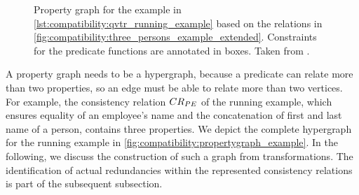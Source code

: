 \begin{figure}
    \centering
    
    
    \caption[Property graph for the running example]{Property graph for the \qvtr example in \autoref{lst:compatibility:qvtr_running_example} based on the relations in \autoref{fig:compatibility:three_persons_example_extended}. Constraints for the predicate functions are annotated in boxes. Taken from .}
    \label{fig:compatibility:propertygraph_example}
\end{figure}

A property graph needs to be a hypergraph, because a predicate can relate more than two properties, so an edge must be able to relate more than two vertices.
For example, the consistency relation $\consistencyrelation{CR}{PE}$ of the running example, which ensures equality of an employee's name and the concatenation of first and last name of a person, contains three properties.
We depict the complete hypergraph for the running example in \autoref{fig:compatibility:propertygraph_example}.
In the following, we discuss the construction of such a graph from \qvtr transformations.
The identification of actual redundancies within the represented consistency relations is part of the subsequent subsection.


